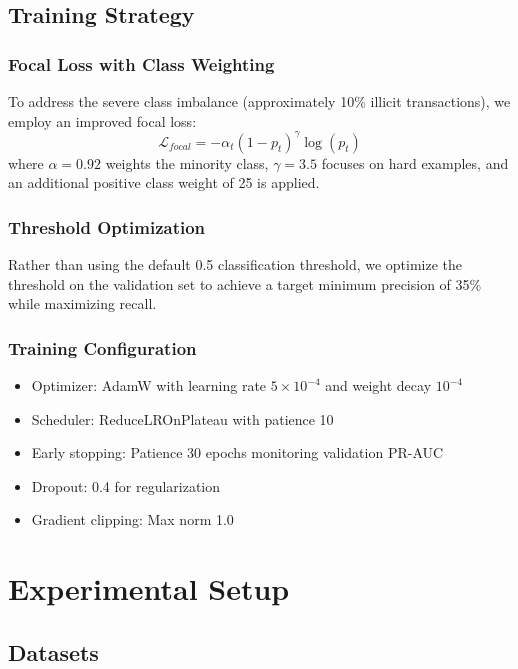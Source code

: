 \documentclass[12pt,a4paper]{article}
\begin{document}
\subsection{Training Strategy}

\subsubsection{Focal Loss with Class Weighting}
To address the severe class imbalance (approximately 10\% illicit transactions), we employ an improved focal loss:
\begin{equation}
    \mathcal{L}_{focal} = -\alpha_t (1 - p_t)^\gamma \log(p_t)
\end{equation}
where $\alpha = 0.92$ weights the minority class, $\gamma = 3.5$ focuses on hard examples, and an additional positive class weight of 25 is applied.

\subsubsection{Threshold Optimization}
Rather than using the default 0.5 classification threshold, we optimize the threshold on the validation set to achieve a target minimum precision of 35\% while maximizing recall.

\subsubsection{Training Configuration}
\begin{itemize}
    \item Optimizer: AdamW with learning rate $5 \times 10^{-4}$ and weight decay $10^{-4}$
    \item Scheduler: ReduceLROnPlateau with patience 10
    \item Early stopping: Patience 30 epochs monitoring validation PR-AUC
    \item Dropout: 0.4 for regularization
    \item Gradient clipping: Max norm 1.0
\end{itemize}

\section{Experimental Setup}

\subsection{Datasets}
\end{document}
